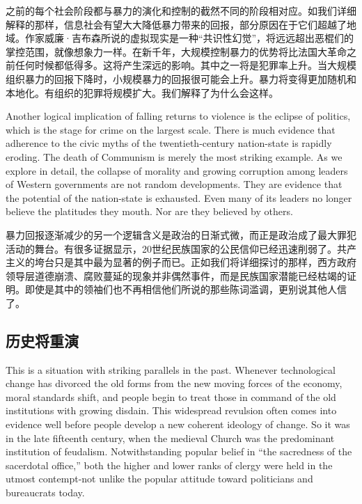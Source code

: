 \begin{Parallel}{97mm}{45mm}
  \ParallelRText
  {\small 之前的每个社会阶段都与暴力的演化和控制的截然不同的阶段相对应。如我们详细解释的那样，信息社会有望大大降低暴力带来的回报，部分原因在于它们超越了地域。作家威廉·吉布森所说的虚拟现实是一种“共识性幻觉”，将远远超出恶棍们的掌控范围，就像想象力一样。在新千年，大规模控制暴力的优势将比法国大革命之前任何时候都低得多。这将产生深远的影响。其中之一将是犯罪率上升。当大规模组织暴力的回报下降时，小规模暴力的回报很可能会上升。暴力将变得更加随机和本地化。有组织的犯罪将规模扩大。我们解释了为什么会这样。 }
  \ParallelPar 


  \ParallelLText
  {Another logical implication of falling returns to violence is the eclipse of politics, which is the stage for crime on the largest scale. There is much evidence that adherence to the civic myths of the twentieth-century nation-state is rapidly eroding. The death of Communism is merely the most striking example. As we explore in detail, the collapse of morality and growing corruption among leaders of Western governments are not random developments. They are evidence that the potential of the nation-state is exhausted. Even many of its leaders no longer believe the platitudes they mouth. Nor are they believed by others.}
  
  \ParallelRText
  {\small 暴力回报逐渐减少的另一个逻辑含义是政治的日渐式微，而正是政治成了最大罪犯活动的舞台。有很多证据显示，20世纪民族国家的公民信仰已经迅速削弱了。共产主义的垮台只是其中最为显著的例子而已。正如我们将详细探讨的那样，西方政府领导层道德崩溃、腐败蔓延的现象并非偶然事件，而是民族国家潜能已经枯竭的证明。即使是其中的领袖们也不再相信他们所说的那些陈词滥调，更别说其他人信了。 }
  \ParallelPar

\subsection{历史将重演} 
  \ParallelLText
  {This is a situation with striking parallels in the past. Whenever technological change has divorced the old forms from the new moving forces of the economy, moral standards shift, and people begin to treat those in command of the old institutions with growing disdain. This widespread revulsion often comes into evidence well before people develop a new coherent ideology of change. So it was in the late fifteenth century, when the medieval Church was the predominant institution of feudalism. Notwithstanding popular belief in “the sacredness of the sacerdotal office,” both the higher and lower ranks of clergy were held in the utmost contempt-not unlike the popular attitude toward politicians and bureaucrats today. }



\end{Parallel}
